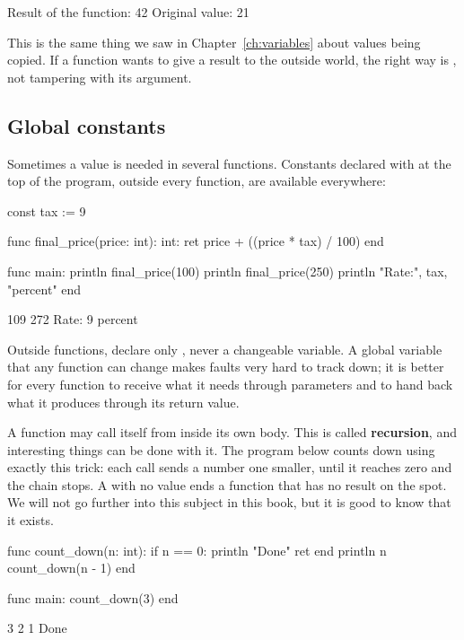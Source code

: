 \begin{salamout}
Result of the function: 42
Original value: 21
\end{salamout}

This is the same thing we saw in Chapter~\ref{ch:variables} about values
being copied. If a function wants to give a result to the outside world, the
right way is , not tampering with its argument.

\subsection{Global constants}

Sometimes a value is needed in several functions. Constants declared with
 at the top of the program, outside every function, are
available everywhere:

\begin{salamcode}
const tax := 9

func final_price(price: int): int:
    ret price + ((price * tax) / 100)
end

func main:
    println final_price(100)
    println final_price(250)
    println "Rate:", tax, "percent"
end
\end{salamcode}

\begin{salamout}
109
272
Rate: 9 percent
\end{salamout}

Outside functions, declare only , never a changeable variable. A
global variable that any function can change makes faults very hard to
track down; it is better for every function to receive what it needs through
parameters and to hand back what it produces through its return value.

\begin{deep}
A function may call itself from inside its own body. This is called
\textbf{recursion}, and interesting things can be done with it. The program
below counts down using exactly this trick: each call sends a number one
smaller, until it reaches zero and the chain stops. A  with no
value ends a function that has no result on the spot. We will not go further
into this subject in this book, but it is good to know that it exists.
\end{deep}

\begin{salamcode}
func count_down(n: int):
    if n == 0:
        println "Done"
        ret
    end
    println n
    count_down(n - 1)
end

func main:
    count_down(3)
end
\end{salamcode}
\begin{salamout}
3
2
1
Done
\end{salamout}

